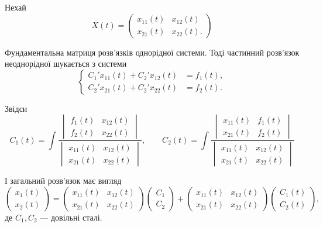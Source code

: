 Нехай
\begin{equation*}
	X(t) = \begin{pmatrix}
		x_{11}(t) & x_{12}(t) \\
		x_{21}(t) & x_{22}(t).
	\end{pmatrix}
\end{equation*}

Фундаментальна матриця розв'язків однорідної системи. Тоді частинний розв'язок неоднорідної шукається з системи
\begin{equation*}
	\left\{
		\begin{aligned}
			C_1' x_{11}(t) + C_2' x_{12}(t) &= f_1(t), \\
			C_2' x_{21}(t) + C_2' x_{22}(t) &= f_2(t).
		\end{aligned}
	\right.
\end{equation*}

Звідси
\begin{equation*}
	C_1(t) = \int \frac{\begin{vmatrix} f_1(t) & x_{12}(t) \\ f_2(t) & x_{22}(t) \end{vmatrix}}{\begin{vmatrix} x_{11}(t) & x_{12}(t) \\ x_{21}(t) & x_{22}(t) \end{vmatrix}}, \qquad C_2(t) = \int \frac{\begin{vmatrix} x_{11}(t) & f_1(t) \\ x_{21}(t) & f_2(t) \end{vmatrix}}{\begin{vmatrix} x_{11}(t) & x_{12}(t) \\ x_{21}(t) & x_{22}(t) \end{vmatrix}}
\end{equation*}
   
І загальний розв'язок має вигляд
\begin{equation*}
	\begin{pmatrix} x_1(t) \\ x_2(t) \end{pmatrix} = \begin{pmatrix} x_{11}(t) & x_{12}(t) \\ x_{21}(t) & x_{22}(t) \end{pmatrix} \begin{pmatrix} C_1 \\ C_2 \end{pmatrix} + \begin{pmatrix} x_{11}(t) & x_{12}(t) \\ x_{21}(t) & x_{22}(t) \end{pmatrix} \begin{pmatrix} C_1(t) \\ C_2(t) \end{pmatrix},
\end{equation*}
де $C_1, C_2$ --- довільні сталі.
